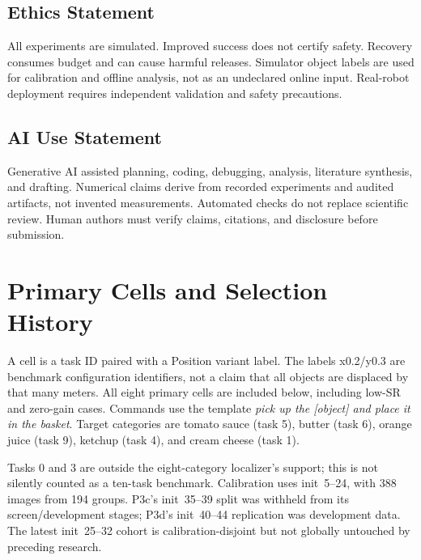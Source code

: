 \documentclass{article}
\begin{document}
\subsection*{Ethics Statement}
All experiments are simulated. Improved success does not certify safety.
Recovery consumes budget and can cause harmful releases.
Simulator object labels are used for calibration and offline analysis,
not as an undeclared online input. Real-robot deployment requires independent
validation and safety precautions.

\subsection*{AI Use Statement}
Generative AI assisted planning, coding, debugging, analysis, literature
synthesis, and drafting. Numerical claims derive from recorded experiments
and audited artifacts, not invented measurements. Automated checks do not
replace scientific review. Human authors must verify claims, citations,
and disclosure before submission.



\clearpage
\appendix

\section{Primary Cells and Selection History}
\label{app:cells}
A cell is a task ID paired with a Position variant label. The labels
x0.2/y0.3 are benchmark configuration identifiers, not a claim that all objects
are displaced by that many meters.
All eight primary cells are included below, including low-SR and zero-gain
cases. Commands use the template \emph{pick up the [object] and place it in the basket}.
Target categories are tomato sauce (task 5), butter (task 6), orange juice
(task 9), ketchup (task 4), and cream cheese (task 1).

\begin{table}[ht]
\caption{Latest primary confirmation, init~25--32 per cell.
H16 is uninterrupted max-value; H8 and recovery branch at 72.}
\centering\small
\end{table}

Tasks 0 and 3 are outside the eight-category localizer's support; this is not
silently counted as a ten-task benchmark.
Calibration uses init~5--24, with 388 images from 194 groups.
P3c's init~35--39 split was withheld from its screen/development stages;
P3d's init~40--44 replication was development data.
The latest init~25--32 cohort is calibration-disjoint but not globally
untouched by preceding research.
\end{document}
